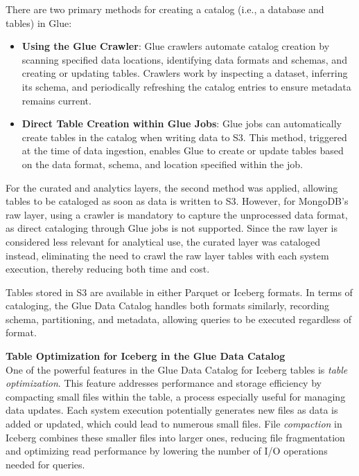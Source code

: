 There are two primary methods for creating a catalog (i.e., a database and tables) in Glue:
\begin{itemize}
    \item \textbf{Using the Glue Crawler}: Glue crawlers automate catalog creation by scanning specified data locations, identifying data formats and schemas, and creating or updating tables. Crawlers work by inspecting a dataset, inferring its schema, and periodically refreshing the catalog entries to ensure metadata remains current.
    
    \item \textbf{Direct Table Creation within Glue Jobs}: Glue jobs can automatically create tables in the catalog when writing data to S3. This method, triggered at the time of data ingestion, enables Glue to create or update tables based on the data format, schema, and location specified within the job.
\end{itemize}

For the curated and analytics layers, the second method was applied, allowing tables to be cataloged as soon as data is written to S3. However, for MongoDB’s raw layer, using a crawler is mandatory to capture the unprocessed data format, as direct cataloging through Glue jobs is not supported. Since the raw layer is considered less relevant for analytical use, the curated layer was cataloged instead, eliminating the need to crawl the raw layer tables with each system execution, thereby reducing both time and cost.

Tables stored in S3 are available in either Parquet or Iceberg formats. In terms of cataloging, the Glue Data Catalog handles both formats similarly, recording schema, partitioning, and metadata, allowing queries to be executed regardless of format.

\textbf{Table Optimization for Iceberg in the Glue Data Catalog} \\
One of the powerful features in the Glue Data Catalog for Iceberg tables is \textit{table optimization}. This feature addresses performance and storage efficiency by compacting small files within the table, a process especially useful for managing data updates. Each system execution potentially generates new files as data is added or updated, which could lead to numerous small files. File \textit{compaction} in Iceberg combines these smaller files into larger ones, reducing file fragmentation and optimizing read performance by lowering the number of I/O operations needed for queries.

